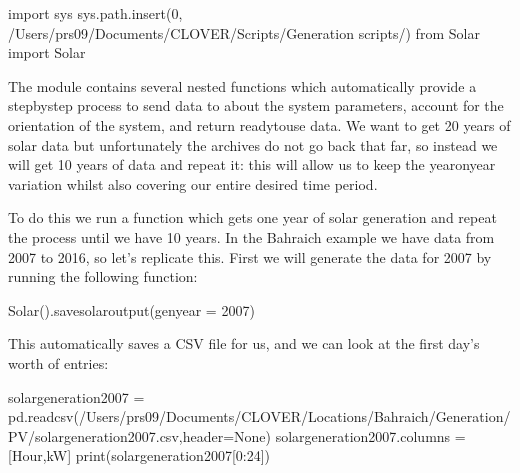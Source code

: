 \documentclass[letterpaper,10pt,english]{sphinxmanual}
\begin{document}
\begin{sphinxVerbatim}[commandchars=\\\{\}]
import sys
sys.path.insert(0, \PYGZsq{}/Users/prs09/Documents/CLOVER/Scripts/Generation scripts/\PYGZsq{})
from Solar import Solar
\end{sphinxVerbatim}

\sphinxAtStartPar
The  module contains several nested functions which automatically
provide a step\sphinxhyphen{}by\sphinxhyphen{}step process to send data to  about
the system parameters, account for the orientation of the system, and
return ready\sphinxhyphen{}to\sphinxhyphen{}use data. We want to get 20 years of solar data but
unfortunately the archives do not go back that far, so instead we will
get 10 years of data and repeat it: this will allow us to keep the
year\sphinxhyphen{}on\sphinxhyphen{}year variation whilst also covering our entire desired time
period.

\sphinxAtStartPar
To do this we run a function which gets one year of solar generation and
repeat the process until we have 10 years. In the Bahraich example we
have data from 2007 to 2016, so let’s replicate this. First we will
generate the data for 2007 by running the following function:

\begin{sphinxVerbatim}[commandchars=\\\{\}]
Solar().save\PYGZus{}solar\PYGZus{}output(gen\PYGZus{}year = 2007)
\end{sphinxVerbatim}

\sphinxAtStartPar
This automatically saves a CSV file for us, and we can look at the first
day’s worth of entries:

\begin{sphinxVerbatim}[commandchars=\\\{\}]
solar\PYGZus{}generation\PYGZus{}2007 = pd.read\PYGZus{}csv(\PYGZdq{}/Users/prs09/Documents/CLOVER/Locations/Bahraich/Generation/PV/solar\PYGZus{}generation\PYGZus{}2007.csv\PYGZdq{},header=None)
solar\PYGZus{}generation\PYGZus{}2007.columns = [\PYGZsq{}Hour\PYGZsq{},\PYGZsq{}kW\PYGZsq{}]
print(solar\PYGZus{}generation\PYGZus{}2007[0:24])
\end{sphinxVerbatim}
\end{document}
